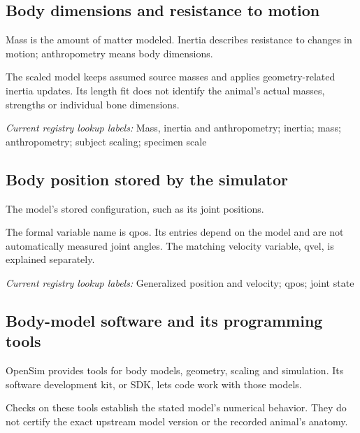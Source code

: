 \begin{samepage}
\subsection*{Body dimensions and resistance to motion}
\noindent Mass is the amount of matter modeled. Inertia describes resistance to changes in motion; anthropometry means body dimensions.\par
\end{samepage}
\begin{samepage}
\noindent The scaled model keeps assumed source masses and applies geometry-related inertia updates. Its length fit does not identify the animal’s actual masses, strengths or individual bone dimensions.\par\nopagebreak[4]

\end{samepage}


\noindent\textit{Current registry lookup labels:} Mass, inertia and anthropometry; inertia; mass; anthropometry; subject scaling; specimen scale\par

\begin{samepage}
\subsection*{Body position stored by the simulator}
\noindent The model’s stored configuration, such as its joint positions.\par
\end{samepage}
\begin{samepage}
\noindent The formal variable name is qpos. Its entries depend on the model and are not automatically measured joint angles. The matching velocity variable, qvel, is explained separately.\par\nopagebreak[4]

\end{samepage}


\noindent\textit{Current registry lookup labels:} Generalized position and velocity; qpos; joint state\par

\begin{samepage}
\subsection*{Body-model software and its programming tools}
\noindent OpenSim provides tools for body models, geometry, scaling and simulation. Its software development kit, or SDK, lets code work with those models.\par
\end{samepage}
\begin{samepage}
\noindent Checks on these tools establish the stated model’s numerical behavior. They do not certify the exact upstream model version or the recorded animal’s anatomy.\par\nopagebreak[4]

\end{samepage}


